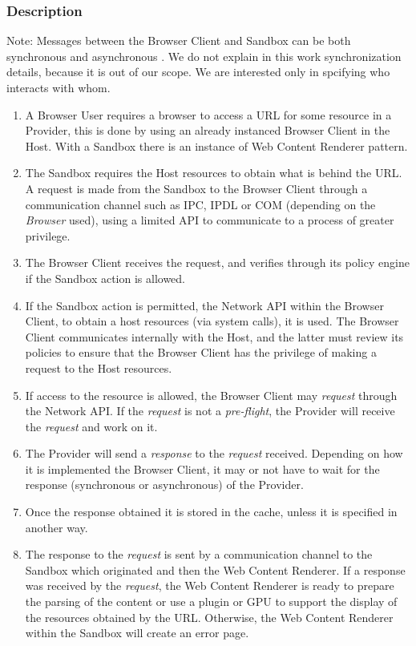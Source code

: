 \documentclass{sig-alternate-05-2015}
\begin{document}
    \subsubsection*{Description}
    Note: Messages between the Browser Client and Sandbox can be both synchronous and asynchronous \cite{firefoxIPC,GCIPC}. We do not explain in this work synchronization details, because it is out of our scope. We are interested only in spcifying who interacts with whom.
      \begin{enumerate}
        \item A Browser User requires a browser to access a URL for some resource in a Provider, this is done by using an already instanced Browser Client in the Host. With a Sandbox there is an instance of Web Content Renderer pattern.
        \item The Sandbox requires the Host resources to obtain what is behind the URL. A request is made from the Sandbox to the Browser Client through a communication channel such as IPC, IPDL or COM (depending on the \textit{Browser} used), using a limited API to communicate to a process of greater privilege.
        \item The Browser Client receives the request, and verifies through its policy engine if the Sandbox action is allowed.
        \item If the Sandbox action is permitted, the Network API within the Browser Client, to obtain a host resources (via system calls), it is used. The Browser Client communicates internally with the Host, and the latter must review its policies to ensure that the Browser Client has the privilege of making a request to the Host resources.
        \item If access to the resource is allowed, the Browser Client may \textit{request} through the Network API. If the \textit{request} is not a \textit{pre-flight}, the Provider will receive the \textit{request} and work on it.
        \item The Provider will send a \textit{response} to the \textit{request} received. Depending on how it is implemented the Browser Client, it may or not have to wait for the response (synchronous or asynchronous) of the Provider.
        \item Once the response obtained it is stored in the cache, unless it is specified in another way.
        \item The response to the \textit{request} is sent by a communication channel to the Sandbox which originated and then the Web Content Renderer. If a response was received by the \textit{request}, the Web Content Renderer is ready to prepare the parsing of the content or use a plugin or GPU to support the display of the resources obtained by the URL. Otherwise, the Web Content Renderer within the Sandbox will create an error page.

\end{enumerate}
\end{document}
